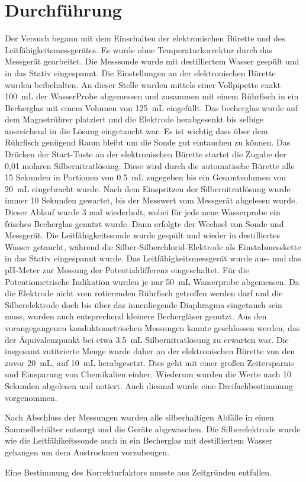 \section{Durchführung}
\label{sec:durchfuerung}

Der Versuch begann mit dem Einschalten der elektronischen Bürette und des Leitfähigkeitsmessgerätes. Es wurde ohne Temperaturkorrektur durch das Messgerät gearbeitet. Die Messsonde wurde mit destilliertem Wasser gespült und in das Stativ eingespannt. Die Einstellungen an der elektronischen Bürette wurden beibehalten. An dieser Stelle wurden mittels einer Vollpipette exakt \SI{100}{\milli\liter} der WasserProbe abgemessen und zusammen mit einem Rührfisch in ein Becherglas mit einem Volumen von \SI{125}{\milli\liter} eingefüllt. Das becherglas wurde auf dem Magnetrührer platziert und die Elektrode herabgesenkt bis selbige ausreichend in die Lösung eingetaucht war. Es ist wichtig dass über dem Rührfisch genügend Raum bleibt um die Sonde gut eintauchen zu können. Das Drücken der Start-Taste an der elektronischen Bürette startet die Zugabe der 0,01 molaren Silbernitratlösung. Diese wird durch die automatische Bürette alle 15 Sekunden in Portionen von \SI{0,5}{\milli\liter} zugegeben bis ein Gesamtvolumen von \SI{20}{\milli\liter} eingebracht wurde. Nach dem Einspritzen der Silbernitratlösung wurde immer 10 Sekunden gewartet, bis der Messwert vom Messgerät abgelesen wurde. Dieser Ablauf wurde 3 mal wiederholt, wobei für jede neue Wasserprobe ein frisches Becherglas genutzt wurde. Dann erfolgte der Wechsel von Sonde und Messgerät. Die Leitfähigkeitssonde wurde gespült und wieder in destilliertes Wasser getaucht, während die Silber-Silberchlorid-Elektrode als Einstabmesskette in das Stativ eingespannt wurde. Das Leitfähigkeitsmessgerät wurde aus- und das pH-Meter zur Messung der Potentialdifferenz eingeschaltet. Für die Potentiometrische Indikation wurden je nur \SI{50}{\milli\liter} Wasserprobe abgemessen. Da die Elektrode  nicht vom rotierenden Rührfisch getroffen werden darf und die Silberelektrode doch bis über das innenliegende Diaphragma eingetauch sein muss, wurden auch entsprechend kleinere Bechergläser genutzt. Aus den vorangegangenen konduktometrischen Messungen konnte geschlossen werden, das der Äquivalenzpunkt bei etwa \SI{3,5}{\milli\liter} Silbernitratlösung zu erwarten war. Die insgesamt zutitrierte Menge wurde daher an der elektronischen Bürette von den zuvor \SI{20}{\milli\liter}, auf \SI{10}{\milli\liter} herabgesetzt. Dies geht mit einer großen Zeitersparnis und Einsparung von Chemikalien einher. Wiederum wurden die Werte nach 10 Sekunden abgelesen und notiert. Auch diesmal wurde eine Dreifachbestimmung vorgenommen.

Nach Abschluss der Messungen wurden alle silberhaltigen Abfälle in einen Sammelbehälter entsorgt und die Geräte abgewaschen. Die Silberelektrode wurde wie die Leitfähikeitssonde auch in ein Becherglas mit destilliertem Wasser gehangen um dem Austrocknen vorzubeugen.

Eine Bestimmung des Korrekturfaktors musste aus Zeitgründen entfallen.